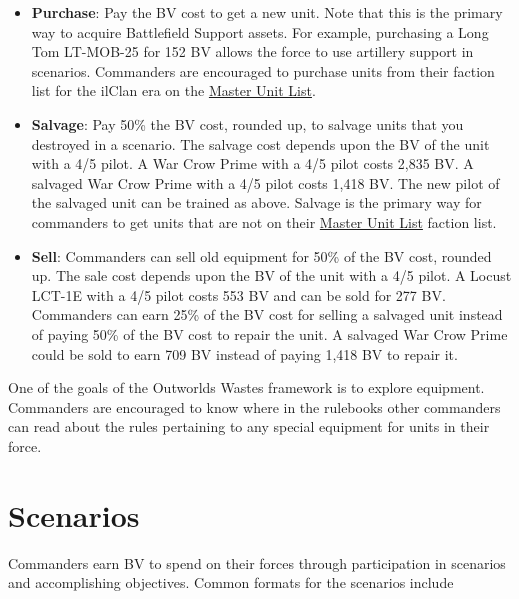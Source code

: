 \documentclass[UTF8]{article}
\begin{document}
\begin{itemize}
\item {\bf Purchase}: Pay the BV cost to get a new unit.
Note that this is the primary way to acquire Battlefield Support assets.
For example, purchasing a Long Tom LT-MOB-25 for 152 BV allows the force to use artillery support in scenarios.
Commanders are encouraged to purchase units from their faction list for the ilClan era on the \href{http://www.masterunitlist.info/}{Master Unit List}.

\item {\bf Salvage}: Pay 50\% the BV cost, rounded up, to salvage units that you destroyed in a scenario.
The salvage cost depends upon the BV of the unit with a 4/5 pilot.
A War Crow Prime with a 4/5 pilot costs 2,835 BV.
A salvaged War Crow Prime with a 4/5 pilot costs 1,418 BV.
The new pilot of the salvaged unit can be trained as above.
Salvage is the primary way for commanders to get units that are not on their \href{http://www.masterunitlist.info/}{Master Unit List} faction list.

\item {\bf Sell}: Commanders can sell old equipment for 50\% of the BV cost, rounded up.
The sale cost depends upon the BV of the unit with a 4/5 pilot.
A Locust LCT-1E with a 4/5 pilot costs 553 BV and can be sold for 277 BV.
Commanders can earn 25\% of the BV cost for selling a salvaged unit instead of paying 50\% of the BV cost to repair the unit.
A salvaged War Crow Prime could be sold to earn 709 BV instead of paying 1,418 BV to repair it.

\end{itemize}

One of the goals of the Outworlds Wastes framework is to explore equipment.
Commanders are encouraged to know where in the rulebooks other commanders can read about the rules pertaining to any special equipment for units in their force.\\

\newpage

\section{Scenarios}

Commanders earn BV to spend on their forces through participation in scenarios and accomplishing objectives.
Common formats for the scenarios include
\end{document}
